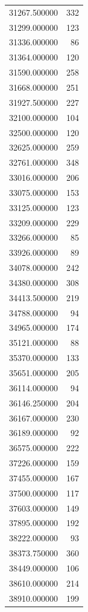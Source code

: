 \begin{tabular}{lr}
31267.500000  &   332 \\
31299.000000  &   123 \\
31336.000000  &    86 \\
31364.000000  &   120 \\
31590.000000  &   258 \\
31668.000000  &   251 \\
31927.500000  &   227 \\
32100.000000  &   104 \\
32500.000000  &   120 \\
32625.000000  &   259 \\
32761.000000  &   348 \\
33016.000000  &   206 \\
33075.000000  &   153 \\
33125.000000  &   123 \\
33209.000000  &   229 \\
33266.000000  &    85 \\
33926.000000  &    89 \\
34078.000000  &   242 \\
34380.000000  &   308 \\
34413.500000  &   219 \\
34788.000000  &    94 \\
34965.000000  &   174 \\
35121.000000  &    88 \\
35370.000000  &   133 \\
35651.000000  &   205 \\
36114.000000  &    94 \\
36146.250000  &   204 \\
36167.000000  &   230 \\
36189.000000  &    92 \\
36575.000000  &   222 \\
37226.000000  &   159 \\
37455.000000  &   167 \\
37500.000000  &   117 \\
37603.000000  &   149 \\
37895.000000  &   192 \\
38222.000000  &    93 \\
38373.750000  &   360 \\
38449.000000  &   106 \\
38610.000000  &   214 \\
38910.000000  &   199 \\

\end{tabular}
